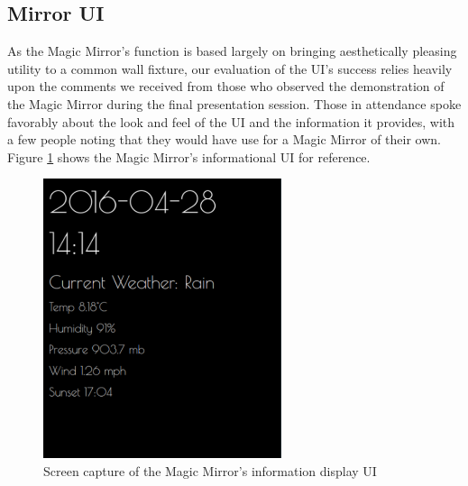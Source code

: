 \documentclass[conference]{IEEEtran}
\begin{document}
\subsection{Mirror UI}
As the Magic Mirror's function is based largely on bringing aesthetically pleasing utility to a common wall fixture, our evaluation of the UI's success relies heavily upon the comments we received from those who observed the demonstration of the Magic Mirror during the final presentation session.
Those in attendance spoke favorably about the look and feel of the UI and the information it provides, with a few people noting that they would have use for a Magic Mirror of their own.
Figure \ref{fig:mirrorui} shows the Magic Mirror's informational UI for reference.
\begin{figure}[!ht]
  \centering
  \includegraphics[width=2.75in]{images/mirror-ss.png}
  \caption{Screen capture of the Magic Mirror's information display UI}
  \label{fig:mirrorui}
\end{figure}


%
%
\end{document}
